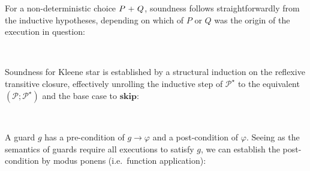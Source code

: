 \documentclass[sigplan]{acmart}%
\begin{document}
For a non-deterministic choice $P\ \AgdaFunction{\ensuremath{+}}\ Q$, 
soundness follows straightforwardly from the inductive hypotheses,
depending on which of $P$ or $Q$ was the origin of the execution in question:
\begin{code}
\>[2]\AgdaSpace{}%
\AgdaSymbol{(}\AgdaSpace{}%
\AgdaSpace{}%
\AgdaSymbol{)}\AgdaSpace{}%
\AgdaSymbol{(}\AgdaSpace{}%
\AgdaSymbol{)}%
\>[30]\AgdaSymbol{=}\AgdaSpace{}%
\AgdaSpace{}%
\AgdaSpace{}%
\<%
\\
%
\>[2]\AgdaSpace{}%
\AgdaSymbol{(}\AgdaSpace{}%
\AgdaSpace{}%
\AgdaSymbol{)}\AgdaSpace{}%
\AgdaSymbol{(}\AgdaSpace{}%
\AgdaSymbol{)}%
\>[30]\AgdaSymbol{=}\AgdaSpace{}%
\AgdaSpace{}%
\AgdaSpace{}%
\<%
\end{code}
Soundness for Kleene star is established by a structural induction on 
the reflexive transitive closure, effectively unrolling the inductive step of $\mathcal{P}^\star$ to 
the equivalent $(\mathcal{P};\mathcal{P}^\star)$ and the base case to $\mathbf{skip}$:
\begin{code}
\>[2]\AgdaSpace{}%
\AgdaSymbol{(}\AgdaSpace{}%
\AgdaSymbol{)}\AgdaSpace{}%
%
\>[30]\AgdaSymbol{=}\AgdaSpace{}%
\<%
\\
%
\>[2]\AgdaSpace{}%
\AgdaSymbol{(}\AgdaSpace{}%
\AgdaSymbol{)}\AgdaSpace{}%
\AgdaSymbol{(}\AgdaSpace{}%
\AgdaSpace{}%
\AgdaSymbol{)}%
\>[30]\AgdaSymbol{=}\AgdaSpace{}%
\AgdaSpace{}\!%
\AgdaSymbol{(}\AgdaSpace{}%
\AgdaSymbol{)}\AgdaSpace{}%
\AgdaSpace{}%
\AgdaSpace{}%
\AgdaSpace{}\!%
\AgdaSpace{}%
\<%
\end{code}
A guard $g$ has a pre-condition of $g \rightarrow \varphi$ and a post-condition of 
$\varphi$. Seeing as the semantics of guards require all executions to satisfy $g$, 
we can establish the post-condition by modus ponens (i.e.\ function application):
\begin{code}
\>[2]\AgdaSpace{}%
\AgdaSymbol{(}\AgdaSpace{}%
\AgdaSymbol{)}\AgdaSpace{}%
\AgdaSymbol{(}\AgdaSpace{}%
\AgdaOperator{\AgdaInductiveConstructor{,}}\AgdaSpace{}%
\AgdaSymbol{)}%
\>[30]\AgdaSymbol{=}\AgdaSpace{}%
\AgdaOperator{\AgdaFunction{\AgdaUnderscore{}\$}}\AgdaSpace{}%
\<%
\end{code}
\end{document}
